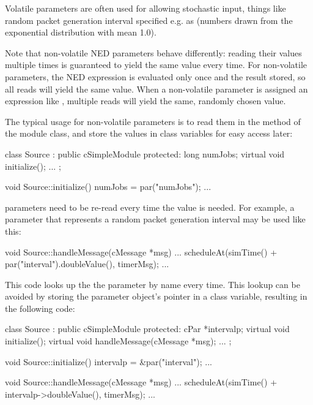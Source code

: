 Volatile parameters are often used for allowing stochastic input, things like
random packet generation interval specified e.g. as 
(numbers drawn from the exponential distribution with mean 1.0).

Note that non-volatile NED parameters behave differently: reading their values
multiple times is guaranteed to yield the same value every time. For
non-volatile parameters, the NED expression is evaluated only once and the
result stored, so all reads will yield the same value. When a non-volatile
parameter is assigned an expression like , multiple
reads will yield the same, randomly chosen value.

The typical usage for non-volatile parameters is to read them in the
 method of the module class, and store the values
in class variables for easy access later:

\begin{cpp}
class Source : public cSimpleModule
{
  protected:
    long numJobs;
    virtual void initialize();
    ...
};

void Source::initialize()
{
    numJobs = par("numJobs");
    ...
}
\end{cpp}

 parameters need to be re-read every time the value is needed.
For example, a parameter that represents a random packet generation interval
may be used like this:

\begin{cpp}
void Source::handleMessage(cMessage *msg)
{
    ...
    scheduleAt(simTime() + par("interval").doubleValue(), timerMsg);
    ...
}
\end{cpp}

This code looks up the the parameter by name every time. This lookup
can be avoided by storing the parameter object's pointer in a class variable,
resulting in the following code:

\begin{cpp}
class Source : public cSimpleModule
{
  protected:
    cPar *intervalp;
    virtual void initialize();
    virtual void handleMessage(cMessage *msg);
    ...
};

void Source::initialize()
{
    intervalp = &par("interval");
    ...
}

void Source::handleMessage(cMessage *msg)
{
    ...
    scheduleAt(simTime() + intervalp->doubleValue(), timerMsg);
    ...
}
\end{cpp}


